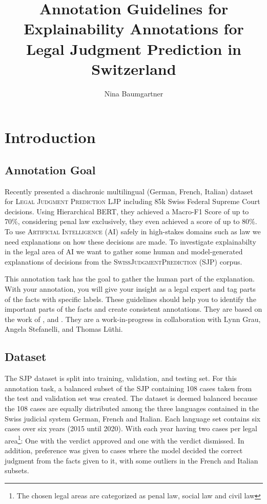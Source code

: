 \documentclass{article}
\title{Annotation Guidelines for Explainability Annotations for Legal Judgment Prediction in Switzerland}
\author{Nina Baumgartner}
\date{} %
\begin{document}
\maketitle
\section{Introduction}
\subsection{Annotation Goal}
Recently  \citet{Niklaus_2021} presented a diachronic multilingual (German, French, Italian) dataset for \textsc{Legal Judgment Prediction} LJP including 85k Swiss Federal Supreme Court decisions. Using Hierarchical BERT, they achieved a Macro-F1 Score of up to 70\%, considering penal law exclusively, they even achieved a score of up to 80\%. To use \textsc{Artificial Intelligence} (AI) safely in high-stakes domains such as law we need explanations on how these decisions are made. To investigate explainabilty in the legal area of AI we want to gather some human and model-generated explanations of decisions from the \textsc{SwissJudgmentPrediction} (SJP) corpus.

This annotation task has the goal to gather the human part of the explanation. With your annotation, you will give your insight as a legal expert and tag parts of the facts with specific labels. These guidelines should help you to identify the important parts of the facts and create consistent annotations. They are based on the work of \cite{Reiter+2020+193+202}, \cite{Leitner_2019} and \cite{pustejovsky2012natural}. They are a work-in-progress in collaboration with Lynn Grau, Angela Stefanelli, and Thomas Lüthi.

\subsection{Dataset}
The SJP dataset is split into training, validation, and testing set. For this annotation task, a balanced subset of the SJP containing 108 cases taken from the test and validation set was created. The dataset is deemed balanced because the 108 cases are equally distributed among the three languages contained in the Swiss judicial system German, French and Italian. Each language set contains six cases over six years (2015 until 2020). With each year having two cases per legal area\footnote{The chosen legal areas are categorized as penal law, social law and civil law}: One with the verdict approved and one with the verdict dismissed. In addition, preference was given to cases where the model decided the correct judgment from the facts given to it, with some outliers in the French and Italian subsets.
\end{document}
